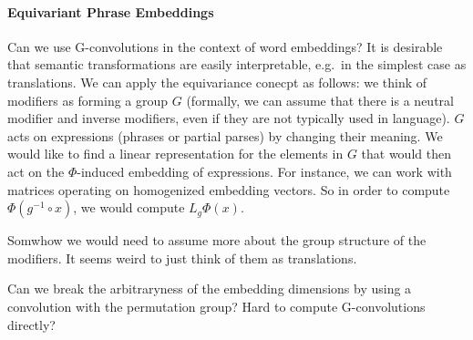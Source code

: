 \documentclass{article}
\begin{document}
\paragraph{Equivariant Phrase Embeddings}

Can we use G-convolutions in the context of word embeddings? It is desirable that semantic transformations are easily interpretable, e.g.~in the simplest case as translations. We can apply the equivariance conecpt as follows: we think of modifiers as forming a group $G$ (formally, we can assume that there is a neutral modifier and inverse modifiers, even if they are not typically used in language). $G$ acts on expressions (phrases or partial parses) by changing their meaning. We would like to find a linear representation for the elements in $G$ that would then act on the $\Phi$-induced embedding of expressions. For instance, we can work with matrices operating on homogenized embedding vectors. So in order to compute $\Phi(g^{-1} \circ x)$, we would compute $L_{g} \Phi(x)  $. 

Somwhow we would need to assume more about the group structure of the modifiers. It seems weird to just think of them as translations. 

Can we break the arbitraryness of the embedding dimensions by using a convolution with the permutation group? Hard to compute G-convolutions directly? 


\end{document}
